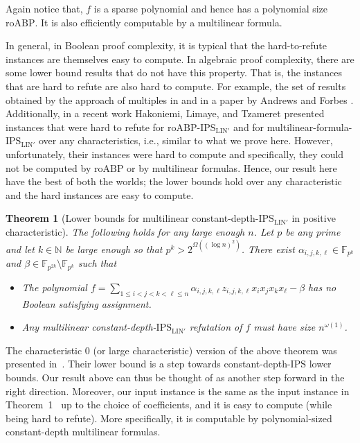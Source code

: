 \documentclass[11pt]{article}
\newtheorem{theorem}{Theorem}[section]
\newcommand{\F}{\mathbb{F}}
\newcommand{\IPS}{\mathrm{IPS}}
\newcommand{\IPSLINp}{\mathrm{IPS}_{\mathrm{LIN}'}}
\newcommand{\roABP}{\mathrm{roABP}}
\begin{document}
Again notice that, $f$  is a sparse polynomial and hence has a polynomial size $\roABP$. It is also efficiently computable by a multilinear formula. 

In general, in Boolean proof complexity, it is typical that the hard-to-refute instances are themselves easy to compute. 
In algebraic proof complexity, there are some lower bound results that do not have this property. That is, the instances that are hard to refute are also hard to compute. For example, the set of results obtained by the approach of multiples in \cite[Theorem 1.18, Theorem 1.19, Theorem 1.20]{FSTW21} and in a paper by Andrews and Forbes \cite{AF22}. Additionally, in a recent work Hakoniemi, Limaye, and Tzameret \cite{HLT24} presented instances that were hard to refute for $\roABP$-$\IPSLINp$ and for multilinear-formula-$\IPSLINp$ over any characteristics, i.e., similar to what we prove here. However, unfortunately, their instances were hard to compute and specifically, they could not be computed by $\roABP$ or by multilinear formulas. Hence, our result here have the best of both the worlds; the lower bounds hold over any characteristic and the hard instances are easy to compute. 

 

\begin{theorem}[Lower bounds for multilinear constant-depth-$\IPSLINp$ in positive characteristic]
    \label{thm:lbd-const-depth}
    The following holds for any large enough $n$. Let $p$ be any prime and let $k \in \mathbb{N}$ be large enough so that $p^k > 2^{\Omega((\log n)^2)}$. There exist $\alpha_{i,j,k,\ell}\in \F_{p^k}$ and $\beta \in \F_{p^{2k}}\setminus \F_{p^k}$ such that 
    \begin{itemize}
        \item The polynomial $f = \sum_{1\leq i < j < k < \ell \leq n}\alpha_{i,j,k,\ell} z_{i,j,k,\ell} x_i x_j x_k x_\ell - \beta$ has no Boolean satisfying assignment.
        \item Any multilinear constant-depth-$\IPSLINp$ refutation of $f$ must have size $n^{\omega(1)}$.
    \end{itemize}
\end{theorem}

The characteristic $0$ (or large characteristic) version of the above theorem was presented in~\cite{GHT}. Their lower bound is a step towards constant-depth-$\IPS$ lower bounds. Our result above can thus be thought of as another step forward in the right direction.
Moreover, our input instance is the same as the input instance in Theorem~1~\cite{GHT} up to the choice of coefficients, and it is easy to compute (while being hard to refute). More specifically, it is computable by polynomial-sized constant-depth multilinear formulas. 
\end{document}
